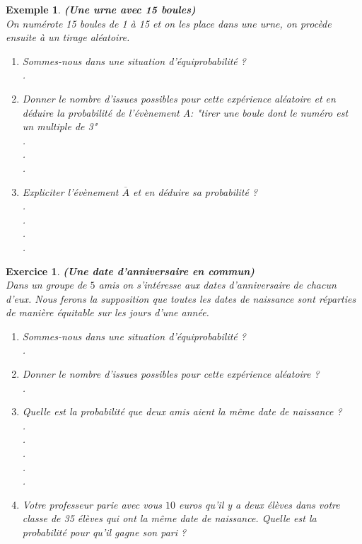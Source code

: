 \documentclass[a4paper,10.5pt]{article}
\newtheorem{ex}{Exemple}
\newtheorem{exer}{Exercice}
\begin{document}
\begin{ex}
	\textbf{(Une urne avec 15 boules)}\\[0.25cm]
	On numérote 15 boules de 1 à 15 et on les place dans une urne, on procède ensuite à un tirage aléatoire.  
	\begin{enumerate}
		
		\item Sommes-nous dans une situation d'équiprobabilité ?\\[0.50cm]
		.\dotfill \\
		\item Donner le nombre d'issues possibles pour cette expérience aléatoire et en déduire la probabilité de l'évènement A: "tirer une boule dont le numéro est un multiple de 3"\\[0.5cm]
		.\dotfill \\[0.2cm].\dotfill \\[0.2cm].\dotfill \\[0.2cm]
		\item Expliciter l'évènement $\overline{A}$ et en déduire sa probabilité ?\\[0.5cm]
		.\dotfill \\[0.2cm].\dotfill \\[0.2cm].\dotfill \\[0.2cm].\dotfill 
	\end{enumerate} 
	
\end{ex}
\newpage
\begin{exer}
	\textbf{(Une date d'anniversaire en commun)}\\[0.25cm]
Dans un groupe de $5$ amis on s'intéresse aux dates d'anniversaire de chacun d'eux. Nous ferons la supposition que toutes les dates de naissance sont réparties de manière équitable sur les jours d'une année.\\[0.15cm] 
\begin{enumerate}
	
\item Sommes-nous dans une situation d'équiprobabilité ?\\[0.50cm]
.\dotfill \\
\item Donner le nombre d'issues possibles pour cette expérience aléatoire ?\\[0.5cm]
.\dotfill \\
\item Quelle est la probabilité que deux amis aient la même date de naissance ?\\[0.5cm]
.\dotfill \\[0.2cm].\dotfill \\[0.2cm].\dotfill \\[0.2cm].\dotfill \\[0.2cm].\dotfill \\[0.2cm]
\item Votre professeur parie avec vous $10$ euros qu'il y a deux élèves dans votre classe de 35 élèves qui ont la même date de naissance. Quelle est la probabilité pour qu'il gagne son pari ? \\[0.5cm]
\end{enumerate}  
\end{exer}
\hfill\\[-2cm]
\end{document}
